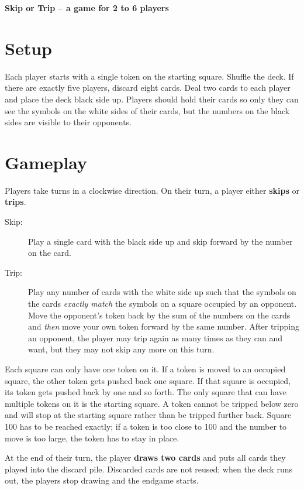 \documentclass{article}
\begin{document}
{\center\LARGE\textbf{Skip or Trip -- a game for 2 to 6 players}}

\section*{Setup}

Each player starts with a single token on the starting square. Shuffle the deck. If there are exactly five players, discard  eight cards. Deal two cards to each player and place the deck black side up. Players should hold their cards so only they can see the symbols on the white sides of their cards, but the numbers on the black sides are visible to their opponents.

\section*{Gameplay}

Players take turns in a clockwise direction. On their turn, a player either \textbf{skips} or \textbf{trips}.

\begin{description}

\item[Skip:] Play a single card with the black side up and skip forward by the number on the card.

\item[Trip:] Play any number of cards with the white side up such that the symbols on the cards \textit{exactly match} the symbols on a square occupied by an opponent. Move the opponent's token back by the sum of the numbers on the cards and \textit{then} move your own token forward by the same number. After tripping an opponent, the player may trip again as many times as they can and want, but they may not skip any more on this turn.

\end{description}

Each square can only have one token on it. If a token is moved to an occupied square, the other token gets pushed back one square. If that square is occupied, its token gets pushed back by one and so forth. The only square that can have multiple tokens on it is the starting square. A token cannot be tripped below zero and will stop at the starting square rather than be tripped further back. Square 100 has to be reached exactly; if a token is too close to 100 and the number to move is too large, the token has to stay in place. 

At the end of their turn, the player \textbf{draws two cards} and puts all cards they played into the discard pile. Discarded cards are not reused; when the deck runs out, the players stop drawing and the endgame starts.
 
\end{document}
